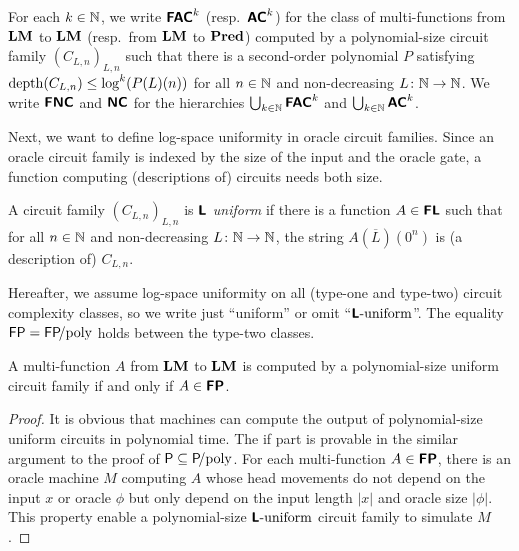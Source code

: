 \documentclass[envcountsame,orivec,oribibl]{llncs}
\begin{document}

\begin{definition}
 For each $k \in \mathbb N$, 
 we write $\text{\bfseries \sffamily \upshape FAC}^k$ (resp.\ $\text{\bfseries \sffamily \upshape AC}^k$) for the class of 
 multi-functions from $\mathbf{LM}$ to $\mathbf{LM}$ (resp.\ from $\mathbf{LM}$ to $\mathbf{Pred}$) computed by
 a polynomial-size circuit family $(C_{L,n})_{L,n}$ such that
 there is a second-order polynomial $P$ satisfying
 $\mathop{\rm depth}(C_{L,n}) \le \log^k(P(L)(n))$ 
 for all $n \in \mathbb N$ and non-decreasing
 $L \colon \mathbb N \to \mathbb N$.
 We write $\text{\bfseries \sffamily \upshape FNC}$ and $\text{\bfseries \sffamily \upshape NC}$ for the hierarchies
 $\bigcup_{k \in \mathbb N} \text{\bfseries \sffamily \upshape FAC}^k$ and $\bigcup_{k \in \mathbb N} \text{\bfseries \sffamily \upshape AC}^k$.
\end{definition}

Next, we want to define log-space uniformity in oracle circuit families.
Since an oracle circuit family is indexed by the size of the input and the oracle gate,
a function computing (descriptions of) circuits needs both size.

\begin{definition}
A circuit family $(C_{L,n})_{L,n}$ is \emph{$\text{\bfseries \sffamily \upshape L}$ uniform} if there is a function $A \in \text{\bfseries \sffamily \upshape FL}$ 
such that for all $n \in \mathbb N$ and non-decreasing $L \colon \mathbb N \to \mathbb N$, 
the string $A (\overline L) (0^n)$ is (a description of) $C_{L,n}$. 
\end{definition}

Hereafter, we assume log-space uniformity on all (type-one and type-two) 
circuit complexity classes, so we write just ``uniform'' or omit ``$\text{\bfseries \sffamily \upshape L}\text{-uniform}$''.
The equality $\mathsf{FP} = \mathsf{FP}\!\text{/poly}$ holds
between the type-two classes.

\begin{theorem}
\label{theorem:P-equals-L-uniform-P-poly}
A multi-function $A$ from $\mathbf{LM}$ to $\mathbf{LM}$ is computed by a polynomial-size
uniform circuit family if and only if $A \in \text{\bfseries \sffamily \upshape FP}$.
\end{theorem}

\begin{proof}
 It is obvious that machines can compute the output of
 polynomial-size uniform circuits in polynomial time.
 The if part is provable in the similar argument to the proof of
 $\mathsf{P} \subseteq \mathsf{P}\!\text{/poly}$.
 For each multi-function $A \in \text{\bfseries \sffamily \upshape FP}$, there is an oracle machine $M$
 computing $A$ whose head movements do not depend on the input $x$ or oracle
 $\phi$ but only depend on the input length $|x|$ and oracle size $|\phi|$.
 This property enable a polynomial-size $\text{\bfseries \sffamily \upshape L}\text{-uniform}$ circuit family to simulate $M$.
\end{proof}
\end{document}
